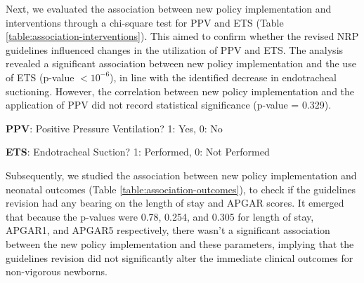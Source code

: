 \documentclass[11pt]{article}
\begin{document}
Next, we evaluated the association between new policy implementation and interventions through a chi-square test for PPV and ETS (Table {}\ref{table:association-interventions}). This aimed to confirm whether the revised NRP guidelines influenced changes in the utilization of PPV and ETS. The analysis revealed a significant association between new policy implementation and the use of ETS (p-value $<$$10^{-6}$), in line with the identified decrease in endotracheal suctioning. However, the correlation between new policy implementation and the application of PPV did not record statistical significance (p-value = 0.329).

\begin{table}[h]
\caption{Test of association between new policy implementation and interventions}
\label{table:association-interventions}
\begin{threeparttable}
\renewcommand{\TPTminimum}{\linewidth}
\begin{tablenotes}
\footnotesize
\item \textbf{PPV}: Positive Pressure Ventilation? 1: Yes, 0: No
\item \textbf{ETS}: Endotracheal Suction? 1: Performed, 0: Not Performed
\end{tablenotes}
\end{threeparttable}
\end{table}


Subsequently, we studied the association between new policy implementation and neonatal outcomes (Table {}\ref{table:association-outcomes}), to check if the guidelines revision had any bearing on the length of stay and APGAR scores. It emerged that because the p-values were 0.78, 0.254, and 0.305 for length of stay, APGAR1, and APGAR5 respectively, there wasn't a significant association between the new policy implementation and these parameters, implying that the guidelines revision did not significantly alter the immediate clinical outcomes for non-vigorous newborns.
\end{document}

